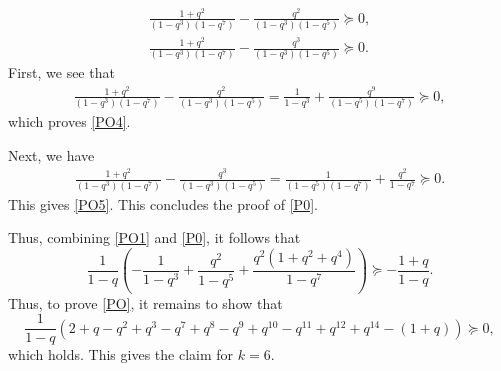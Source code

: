 \documentclass[12pt,reqno]{amsart}
\renewcommand{\(}{\left\(}
\renewcommand{\)}{\right\)}
\numberwithin{equation}{section}
\theoremstyle{plain}
\theoremstyle{definition}
\numberwithin{equation}{section}
\begin{document}
\begin{align}\label{PO4}
\frac{1+q^2}{\left(1-q^3\right)\left(1-q^7\right)}-\frac{q^2}{\left(1-q^3\right)\left(1-q^5\right)}\succeq 0,\\\label{PO5}
\frac{1+q^2}{\left(1-q^3\right)\left(1-q^7\right)}-\frac{q^3}{\left(1-q^3\right)\left(1-q^5\right)}\succeq 0.
\end{align}
First, we see that
\begin{align*}
\frac{1+q^2}{\left(1-q^3\right)\left(1-q^7\right)}-\frac{q^2}{\left(1-q^3\right)\left(1-q^5\right)}%
=\frac{1}{1-q^3}+\frac{q^9}{\left(1-q^5\right)\left(1-q^7\right)}\succeq 0,
\end{align*}
which proves \eqref{PO4}. 

Next, we have
\begin{align*}
\frac{1+q^2}{\left(1-q^3\right)\left(1-q^7\right)}-\frac{q^3}{\left(1-q^3\right)\left(1-q^5\right)}%
=\frac{1}{\left(1-q^5\right)\left(1-q^7\right)}+\frac{q^2}{1-q^7}\succeq 0.
\end{align*}
This gives \eqref{PO5}. This concludes the proof of \eqref{P0}. 

Thus, combining \eqref{PO1} and \eqref{P0}, it follows that
\begin{equation*}
\frac{1}{1-q}\!\left(- \frac{1}{1-q^3}\!+\! \frac{q^2}{1-q^5}\!+\!\frac{q^2\left(1+q^2+q^4\right)}{1-q^7}\right)\!\succeq -\frac{1+q}{1-q}.
\end{equation*}
Thus, to prove \eqref{PO}, it remains to show that
\[
\frac{1}{1-q}\left(2+q-q^2+q^3-q^7+q^8-q^9+q^{10}-q^{11}+q^{12}+q^{14}-\left(1+q\right)\right)\succeq 0,
\]
which holds. This gives the claim for $k=6$.
\end{document}
